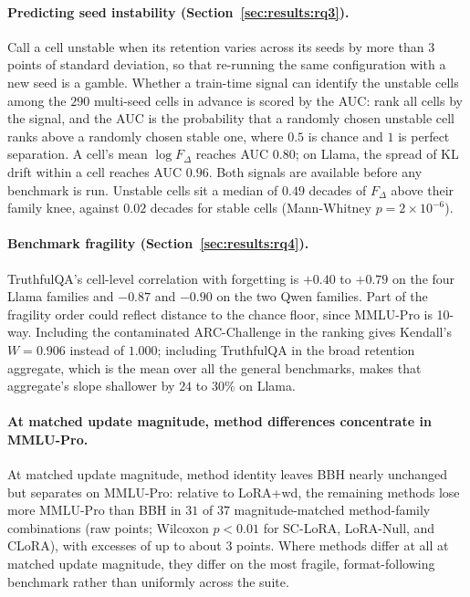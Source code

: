 \documentclass[11pt]{article}
\newcommand{\dw}{F_{\Delta}}
\begin{document}
\paragraph{Predicting seed instability (Section~\ref{sec:results:rq3}).} Call
a cell unstable when its retention varies across its seeds by more than $3$
points of standard deviation, so that re-running the same configuration with a
new seed is a gamble. Whether a train-time signal can identify the unstable
cells among the $290$ multi-seed cells in advance is scored by the AUC: rank
all cells by the signal, and the AUC is the probability that a randomly
chosen unstable cell ranks above a randomly chosen stable one, where $0.5$ is
chance and $1$ is perfect separation. A cell's mean $\log\dw$ reaches AUC
$0.80$; on Llama, the spread of KL drift within a cell reaches AUC $0.96$.
Both signals are available before any benchmark is run. Unstable cells sit a
median of $0.49$ decades of $\dw$ above their family knee, against $0.02$
decades for stable cells (Mann-Whitney $p\!=\!2\times10^{-6}$).

\paragraph{Benchmark fragility (Section~\ref{sec:results:rq4}).}
TruthfulQA's cell-level correlation with forgetting is $+0.40$ to $+0.79$ on
the four Llama families and $-0.87$ and $-0.90$ on the two Qwen families.
Part of the fragility order could reflect distance to the chance floor, since
MMLU-Pro is 10-way. Including the contaminated ARC-Challenge in the ranking
gives Kendall's $W\!=\!0.906$ instead of $1.000$; including TruthfulQA in the
broad retention aggregate, which is the mean over all the general benchmarks,
makes that aggregate's slope shallower by $24$ to $30\%$ on Llama.

\paragraph{At matched update magnitude, method differences concentrate in
MMLU-Pro.} At matched update magnitude, method identity leaves BBH nearly
unchanged but separates on MMLU-Pro: relative to LoRA{+}wd, the remaining
methods lose more MMLU-Pro than BBH in $31$ of $37$ magnitude-matched
method-family combinations (raw points; Wilcoxon $p<0.01$ for SC-LoRA,
LoRA-Null, and CLoRA), with excesses of up to about $3$ points. Where
methods differ at all at matched update magnitude, they differ on the most
fragile, format-following benchmark rather than uniformly across the suite.
\end{document}
